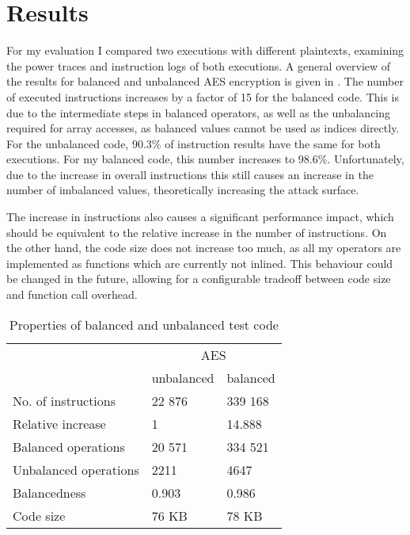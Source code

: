 \chapter{Results}
\label{results}
For my evaluation I compared two executions with different plaintexts, examining the power traces and instruction logs of both executions.
A general overview of the results for balanced and unbalanced AES encryption is given in .
The number of executed instructions increases by a factor of 15 for the balanced code.
This is due to the intermediate steps in balanced operators, as well as the unbalancing required for array accesses, as balanced values cannot be used as indices directly.
For the unbalanced code, 90.3\% of instruction results have the same \hammingw{} for both executions.
For my balanced code, this number increases to 98.6\%.
Unfortunately, due to the increase in overall instructions this still causes an increase in the number of imbalanced values, theoretically increasing the attack surface.

The increase in instructions also causes a significant performance impact, which should be equivalent to the relative increase in the number of instructions.
On the other hand, the code size does not increase too much, as all my operators are implemented as functions which are currently not inlined.
This behaviour could be changed in the future, allowing for a configurable tradeoff between code size and function call overhead.

\begin{table}[h]
  \centering
  \begin{tabular}{|l|l|l|}
    \hline
    & \multicolumn{2}{c|}{AES} \\
    \cline{2-3}
    & unbalanced & balanced \\
    \cline{2-3}
    No. of instructions & 22 876 & 339 168 \\
    Relative increase & 1 & 14.888 \\
    Balanced operations & 20 571 & 334 521 \\
    Unbalanced operations & 2211 & 4647 \\
    Balancedness      & 0.903 & 0.986 \\
    Code size         & 76 KB & 78 KB \\
    \hline
  \end{tabular}
  \caption{Properties of balanced and unbalanced test code}
  \label{tbl:properties}
\end{table}

